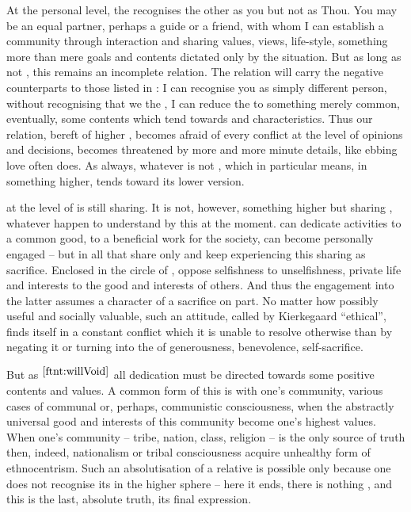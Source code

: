 \pa  %
At the personal level, the  recognises the other as you but
not as Thou.  You may be an equal partner, perhaps a guide or a friend, with
whom I can establish a community through interaction and sharing values, views,
life-style, something more than mere goals and contents dictated only by the
 situation. But as long as not , this remains
an incomplete relation.
The relation will carry the negative counterparts to those listed in
: I can recognise you as simply different person,
without recognising that we  the , I can reduce the
 to something merely common, eventually, some  contents
which tend towards  and  characteristics.  Thus our
relation, bereft of higher , becomes afraid of every conflict at
the level of  opinions and decisions, becomes threatened by more and
more minute details, like ebbing love often does. As always, whatever is not
, which in particular means,  in something
higher, tends toward its lower version.


{} at the level of  is still sharing. It is
not, however,  something higher but sharing , whatever
 happen to understand by this at the moment.  can dedicate 
activities to a common good, to a beneficial work for the society,  can
become personally engaged -- but in all that  share only  and
keep experiencing this sharing as sacrifice.  Enclosed in the circle of
,  oppose selfishness to unselfishness,  private life
and interests to the good and interests of others. And thus the engagement into
the latter assumes a character of a sacrifice on  part. No matter how
possibly useful and socially valuable, such an attitude, called by Kierkegaard
``ethical'', finds itself in a constant conflict which it is unable to resolve
otherwise than by negating it or turning  into the 
of  generousness,  benevolence,  self-sacrifice.

But as $^{\ref{ftnt:willVoid}}$ all 
dedication must be directed towards some positive contents and values.  A common
form of this is  with one's community, various cases of
communal or, perhaps, communistic consciousness, when the abstractly universal
good and interests of this community become one's highest values.  When one's
community -- tribe, nation, class, religion -- is the only source of truth then,
indeed, nationalism or tribal consciousness acquire unhealthy form of ethnocentrism.
Such an absolutisation of a relative is possible only because one does not
recognise its  in the higher sphere -- here it ends, there
is nothing , and this is the last, absolute truth, its final
expression.

